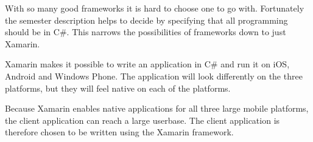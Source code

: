 With so many good frameworks it is hard to choose one to go with. Fortunately the semester description helps to decide by specifying that all programming should be in C\#. This narrows the possibilities of frameworks down to just Xamarin.

Xamarin makes it possible to write an application in C\# and run it on iOS, Android and Windows Phone. The application will look differently on the three platforms, but they will feel native on each of the platforms.

Because Xamarin enables native applications for all three large mobile platforms, the client application can reach a large userbase. The client application is therefore chosen to be written using the Xamarin framework.


